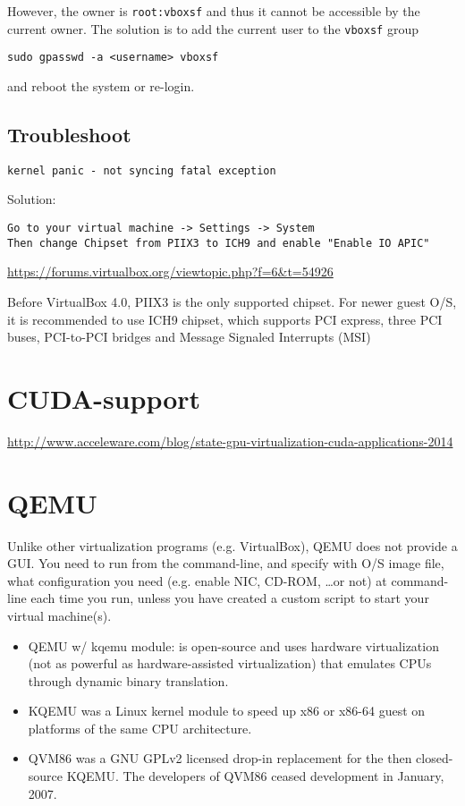 However, the owner is \verb!root:vboxsf! and thus it cannot be accessible by the
current owner. The solution is to add the current user to the \verb!vboxsf!
group
\begin{verbatim}
sudo gpasswd -a <username> vboxsf
\end{verbatim}
and reboot the system or re-login. 

\subsection{Troubleshoot}

\begin{verbatim}
kernel panic - not syncing fatal exception
\end{verbatim}
Solution:
\begin{verbatim}
Go to your virtual machine -> Settings -> System
Then change Chipset from PIIX3 to ICH9 and enable "Enable IO APIC"
\end{verbatim}
\url{https://forums.virtualbox.org/viewtopic.php?f=6&t=54926}

Before VirtualBox 4.0, PIIX3 is the only supported chipset. For newer guest O/S,
it is recommended to use ICH9 chipset, which supports PCI express, three PCI
buses, PCI-to-PCI bridges and Message Signaled Interrupts (MSI)


\section{CUDA-support}

\url{http://www.acceleware.com/blog/state-gpu-virtualization-cuda-applications-2014}


\section{QEMU}
\label{sec:QEMU}

Unlike other virtualization programs (e.g. VirtualBox),
QEMU does not provide a GUI. You need to run from the command-line, and specify
with O/S image file, what configuration you need (e.g. enable NIC, CD-ROM,
\ldots or not) at command-line each time you run, unless you have created a
custom script to start your virtual machine(s). 

\begin{itemize} 
  \item    QEMU w/ kqemu module: is open-source and uses hardware virtualization
  (not as powerful as hardware-assisted virtualization) that emulates CPUs
  through dynamic binary translation.
  
  \item KQEMU was a Linux kernel module to speed up x86 or x86-64 guest on
  platforms of the same CPU architecture.
  
  \item QVM86 was a GNU GPLv2 licensed drop-in replacement for the then
  closed-source KQEMU. The developers of QVM86 ceased development in January, 2007.
  
\end{itemize}


